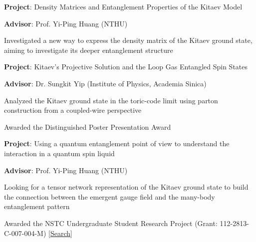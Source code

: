 \documentclass[12font]{article}
\begin{document}


    \begin{sublist}
        \item \textbf{Project}: Density Matrices and Entanglement Properties of the Kitaev Model
        \item \textbf{Advisor}: Prof. Yi-Ping Huang (NTHU) 
        \item Investigated a new way to express the density matrix of the Kitaev ground state, aiming to investigate its deeper entanglement structure
    \end{sublist}


    \begin{sublist}
        \item \textbf{Project}: Kitaev’s Projective Solution and the Loop Gas Entangled Spin States
        \item \textbf{Advisor}: Dr. Sungkit Yip (Institute of Physics, Academia Sinica)
        \item Analyzed the Kitaev ground state in the toric-code limit using parton construction from a coupled-wire perspective
        \item Awarded the Distinguished Poster Presentation Award
    \end{sublist}


    \begin{sublist}
        \item \textbf{Project}: Using a quantum entanglement point of view to understand the interaction in a quantum spin liquid
        \item \textbf{Advisor}: Prof. Yi-Ping Huang (NTHU)
        \item Looking for a tensor network representation of the Kitaev ground state to build the connection between the emergent gauge field and the many-body entanglement pattern
        \item Awarded the NSTC Undergraduate Student Research Project (Grant: 112-2813-C-007-004-M) [\href{https://wsts.nstc.gov.tw/STSWeb/Award/AwardMultiQuery.aspx?year=112&code=QS05&organ=D\%2cFDA1\%2cFDA1DB03&name=}{Search}]
    \end{sublist}
\end{document}
